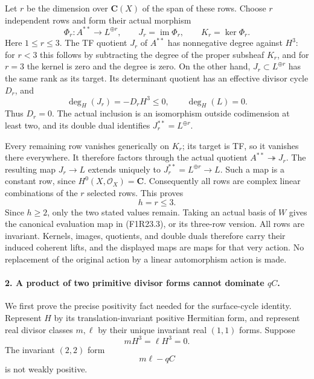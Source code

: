 Let $r$ be the dimension over $\mathbf C(X)$ of the
span of these rows. Choose $r$ independent rows and
form their actual morphism
\[
 \Phi_r:A^{**}\longrightarrow L^{\oplus r},\qquad
 J_r=\operatorname{im}\Phi_r,
 \qquad K_r=\ker\Phi_r.
 \tag{F1R23.4}
\]
Here $1\le r\le3$. The TF quotient $J_r$ of
$A^{**}$ has nonnegative degree against $H^3$:
for $r<3$ this follows by subtracting the degree of
the proper subsheaf $K_r$, and for $r=3$ the kernel
is zero and the degree is zero. On the other hand,
$J_r\subset L^{\oplus r}$ has the same rank as its
target. Its determinant quotient has an effective
divisor cycle $D_r$, and
\[
 \deg_H(J_r)=-D_rH^3\le0,
              \qquad \deg_H(L)=0.
 \tag{F1R23.5}
\]
Thus $D_r=0$. The actual inclusion is an isomorphism
outside codimension at least two, and its double
dual identifies $J_r^{**}=L^{\oplus r}$.

Every remaining row vanishes generically on $K_r$;
its target is TF, so it vanishes there everywhere.
It therefore factors through the actual quotient
$A^{**}\twoheadrightarrow J_r$. The resulting map
$J_r\to L$ extends uniquely to
$J_r^{**}=L^{\oplus r}\to L$. Such a map is a
constant row, since $H^0(X,\mathcal O_X)=\mathbf C$.
Consequently all rows are complex linear combinations
of the $r$ selected rows. This proves
\[
                            h=r\le3.
 \tag{F1R23.6}
\]
Since $h\ge2$, only the two stated values remain.
Taking an actual basis of $W$ gives the canonical
evaluation map in (F1R23.3), or its three-row version.
All rows are invariant. Kernels, images, quotients,
and double duals therefore carry their induced
coherent lifts, and the displayed maps are maps for
that very action. No replacement of the original
action by a linear automorphism action is made.

\paragraph{2. A product of two primitive divisor forms cannot dominate $qC$.}
We first prove the precise positivity fact needed
for the surface-cycle identity. Represent $H$ by its
translation-invariant positive Hermitian form, and
represent real divisor classes $m,\ell$ by their
unique invariant real $(1,1)$ forms. Suppose
\[
                         mH^3=\ell H^3=0.
 \tag{F1R23.7}
\]
The invariant $(2,2)$ form
\[
                                 m\ell-qC
 \tag{F1R23.8}
\]
is not weakly positive.

